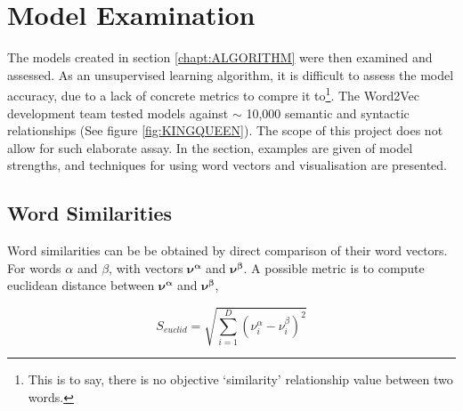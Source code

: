 \chapter{Model Examination}
The models created in section \ref{chapt:ALGORITHM} were then examined and assessed. As an unsupervised learning algorithm, it is difficult to assess the model accuracy, due to a lack of concrete metrics to compre it to\footnote{This is to say, there is no objective `similarity' relationship value between two words.}. The Word2Vec development team tested models against $\sim$ 10,000 semantic and syntactic relationships (See figure \ref{fig:KINGQUEEN})\cite{word2vec}. The scope of this project does not allow for such elaborate assay. In the section, examples are given of model strengths, and techniques for using word vectors and visualisation are presented. 
\section{Word Similarities}
Word similarities can be be obtained by direct comparison of their word vectors. For words $\alpha$ and $\beta$, with vectors $\mathbf{\nu^\alpha}$ and $\mathbf{\nu^\beta}$.  A possible metric is to compute euclidean distance between $\mathbf{\nu^\alpha}$ and $\mathbf{\nu^\beta}$, 

$$S_{euclid} = \sqrt{\sum_{i=1}^{D}(\nu_i^{\alpha}-\nu_i^{\beta})^{2}} $$

